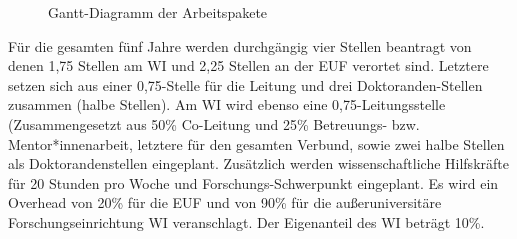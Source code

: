 \documentclass[a4paper,11pt,twoside]{scrartcl}
\begin{document}
\begin{figure}[ht!]
\begin{center}
\end{center}
\caption{Gantt-Diagramm der Arbeitspakete}
\label{fig:gantchart}
\end{figure}
Für die gesamten fünf Jahre werden durchgängig vier Stellen beantragt von denen 1,75 Stellen am WI und 2,25 Stellen an der EUF verortet sind. Letztere setzen sich aus einer 0,75-Stelle für die Leitung und drei Doktoranden-Stellen zusammen (halbe Stellen). Am WI wird ebenso eine 0,75-Leitungsstelle (Zusammengesetzt aus 50\% Co-Leitung und 25\% Betreuungs- bzw. Mentor*innenarbeit, letztere für den gesamten Verbund, sowie zwei halbe Stellen als Doktorandenstellen eingeplant. Zusätzlich werden wissenschaftliche Hilfskräfte für 20 Stunden pro Woche und Forschungs-Schwerpunkt eingeplant. Es wird ein Overhead von 20\% für die EUF und von 90\% für die außeruniversitäre Forschungseinrichtung WI veranschlagt. Der Eigenanteil des WI beträgt 10\%.\\
\end{document}
